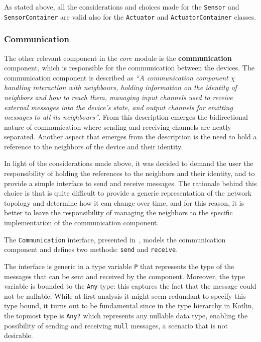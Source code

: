 

As stated above, all the considerations and choices made for the \texttt{Sensor} and \texttt{SensorContainer} are valid also for the \texttt{Actuator}
and \texttt{ActuatorContainer} classes.

\subsubsection{Communication}

The other relevant component in the \emph{core} module is the \textbf{communication} component, which is responsible for the communication between
the devices.
The communication component is described as \textit{``A communication component $\chi$ handling interaction with neighbours, holding information on
	the identity of neighbors and how to reach them, managing input channels used to receive external messages into the device’s state, and output
	channels for emitting messages to all its neighbours''}.
From this description emerges the bidirectional nature of communication where sending and receiving channels are neatly separated.
Another aspect that emerges from the description is the need to hold a reference to the neighbors of the device and their identity.

In light of the considerations made above, it was decided to demand the user the responsibility of holding the references to the neighbors and
their identity, and to provide a simple interface to send and receive messages. The rationale behind this choice is that is quite difficult to
provide a generic representation of the network topology and determine how it can change over time, and for this reason, it is better to leave the
responsibility of managing the neighbors to the specific implementation of the communication component.

The \texttt{Communication} interface, presented in~, models the communication component and defines
two methods: \texttt{send} and \texttt{receive}.



The interface is generic in a type variable \texttt{P} that represents the type of the messages that can be sent and received by the component.
Moreover, the type variable is bounded to the \texttt{Any} type: this captures the fact that the message could not be nullable.
While at first analysis it might seem redundant to specify this type bound, it turns out to be fundamental since in the type hierarchy in Kotlin, the
topmost type is \texttt{Any?} which represents any nullable data type, enabling the possibility of sending and receiving \texttt{null} messages,
a scenario that is not desirable.


